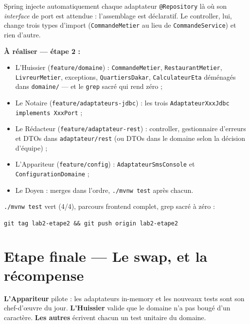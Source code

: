 \documentclass[a4paper,11pt]{article}
\begin{document}
Spring injecte automatiquement chaque adaptateur \texttt{@Repository} là où
son \emph{interface} de port est attendue : l'assemblage est déclaratif.
Le controller, lui, change trois types d'import (\texttt{CommandeMetier} au
lieu de \texttt{CommandeService}) et rien d'autre.

\begin{todobox}
\textbf{À réaliser --- étape 2 :}
\begin{itemize}[nosep]
  \item L'Huissier (\texttt{feature/domaine}) : \texttt{CommandeMetier},
        \texttt{RestaurantMetier}, \texttt{LivreurMetier}, exceptions,
        \texttt{QuartiersDakar}, \texttt{CalculateurEta} déménagés dans
        \texttt{domaine/} --- et le \texttt{grep} sacré qui rend zéro ;
  \item Le Notaire (\texttt{feature/adaptateurs-jdbc}) : les trois
        \texttt{AdaptateurXxxJdbc implements XxxPort} ;
  \item Le Rédacteur (\texttt{feature/adaptateur-rest}) : controller,
        gestionnaire d'erreurs et DTOs dans \texttt{adaptateur/rest} (ou
        DTOs dans le domaine selon la décision d'équipe) ;
  \item L'Appariteur (\texttt{feature/config}) :
        \texttt{AdaptateurSmsConsole} et \texttt{ConfigurationDomaine} ;
  \item Le Doyen : merges dans l'ordre, \texttt{./mvnw test} après chacun.
\end{itemize}
\end{todobox}

\begin{tagbox}
\texttt{./mvnw test} vert (4/4), parcours frontend complet, grep sacré à zéro :
\begin{center}
\texttt{git tag lab2-etape2 \&\& git push origin lab2-etape2}
\end{center}
\end{tagbox}

\section{Etape finale --- Le swap, et la récompense}

\begin{collabox}
\textbf{L'Appariteur} pilote : les adaptateurs in-memory et les nouveaux
tests sont son chef-d'\oe uvre du jour. \textbf{L'Huissier} valide que le
domaine n'a pas bougé d'un caractère. \textbf{Les autres} écrivent chacun
un test unitaire du domaine.
\end{collabox}
\end{document}

